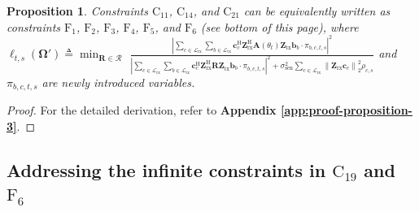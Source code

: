 \documentclass[10pt,journal,compsoc]{IEEEtran}
\newtheorem{proposition}{Proposition}
\theoremstyle{myremark}
\theoremstyle{myexample}
\begin{document}
\begin{proposition} \label{thm:proposition-3}
	Constraints $ \mathrm{C}_{11} $, $ \mathrm{C}_{14} $, and $ \mathrm{C}_{21} $ can be equivalently written as constraints $ \mathrm{F}_{1} $, $ \mathrm{F}_{2} $, $ \mathrm{F}_{3} $, $ \mathrm{F}_{4} $, $ \mathrm{F}_{5} $, and $ \mathrm{F}_{6} $ (see bottom of this page), where $ \ell_{t,s} (\boldsymbol{\Omega}') \triangleq  \min_{\mathbf{R} \in \mathcal{R}} $ $\frac{ \left| \sum_{c \in \mathcal{L}_\mathrm{rx}} \sum_{b \in \mathcal{L}_\mathrm{tx}} \mathbf{c}_c^\mathrm{H} \mathbf{Z}_\mathrm{rx}^\mathrm{H} \mathbf{A} \left( \theta_t \right) \mathbf{Z}_\mathrm{tx} \mathbf{b}_b \cdot \pi_{b,c,t,s} \right|^2 } { \left| \sum_{c \in \mathcal{L}_\mathrm{rx}} \sum_{b \in \mathcal{L}_\mathrm{tx}}  \mathbf{c}_c^\mathrm{H} \mathbf{Z}_\mathrm{rx}^\mathrm{H} \mathbf{R} \mathbf{Z}_\mathrm{tx} \mathbf{b}_b \cdot \pi_{b,c,t,s} \right|^2 + \sigma_\mathrm{sen}^2 \sum_{c \in \mathcal{L}_\mathrm{rx}} \left\| \mathbf{Z}_\mathrm{rx} \mathbf{c}_c \right\|_2^2 \rho_{c,s} } $ and $ \pi_{b,c,t,s} $ are newly introduced variables.
\end{proposition} 
\begin{proof} 
	For the detailed derivation, refer to \textbf{Appendix \ref{app:proof-proposition-3}}.
\end{proof}






\subsection{Addressing the infinite constraints in $ \mathrm{C}_{19} $ and $ \mathrm{F}_{6} $}
\end{document}
